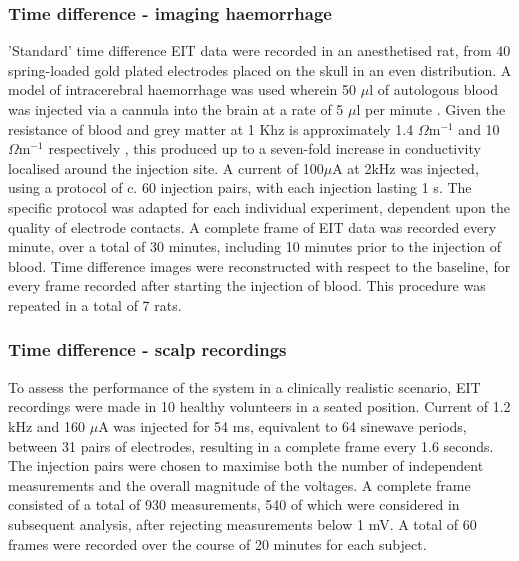 \subsubsection{Time difference - imaging haemorrhage}
'Standard' time difference EIT data were recorded in an anesthetised rat, from 40 spring-loaded gold plated electrodes placed on the skull in an even distribution. A model of intracerebral haemorrhage was used wherein 50 $\mu$l of autologous blood was injected via a cannula into the brain at a rate of 5 $\mu$l per minute \cite{Dowrick_2016}. Given the resistance of blood and grey matter at 1 Khz is approximately 1.4 $\Omega {\text{m}}^{-1}$ and 10 $\Omega {\text{m}}^{-1}$ respectively \cite{Gabriel_2009}, this produced up to a seven-fold increase in conductivity localised around the injection site. A current of 100\( \mu \)A at 2kHz was injected, using a protocol of c. 60 injection pairs, with each injection lasting 1 s. The specific protocol was adapted for each individual experiment, dependent upon the quality of electrode contacts. A complete frame of EIT data was recorded every minute, over a total of 30 minutes, including 10 minutes prior to the injection of blood.  Time difference images were reconstructed with respect to the baseline, for every frame recorded after starting the injection of blood. This procedure was repeated in a total of 7 rats. 

\subsubsection{Time difference - scalp recordings}
\label{methodsTD}
To assess the performance of the system in a clinically realistic scenario, EIT recordings were made in 10 healthy volunteers in a seated position. Current of 1.2 kHz and 160 $\mu$A was injected for 54 ms, equivalent to 64 sinewave periods, between 31 pairs of electrodes, resulting in a complete frame every 1.6 seconds. The injection pairs were chosen to maximise both the number of independent measurements and the overall magnitude of the voltages\cite{Malone2014a}. A complete frame consisted of a total of 930 measurements, 540 of which were considered in subsequent analysis, after rejecting measurements below 1 mV. A total of 60 frames were recorded over the course of 20 minutes for each subject. 